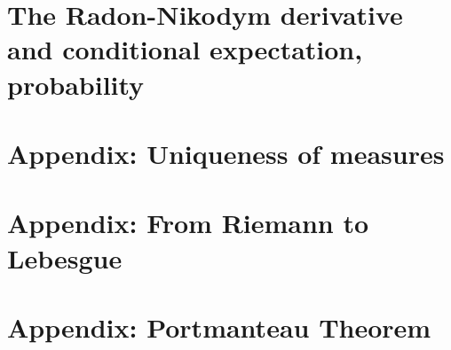 \documentclass{lecturenotes}
\begin{document}
\chapter{The Radon-Nikodym derivative and conditional expectation, probability}
\label{chapter:radon-nikodym}

%
%
%

\appendix
\chapter{Appendix: Uniqueness of measures}
\label{chapter:uniqueness_measures}


\chapter{Appendix: From Riemann to Lebesgue}
\label{chapter:appendix-2}


\chapter{Appendix: Portmanteau Theorem}
\label{chapter:appendix-portmanteau}


%
\end{document}
